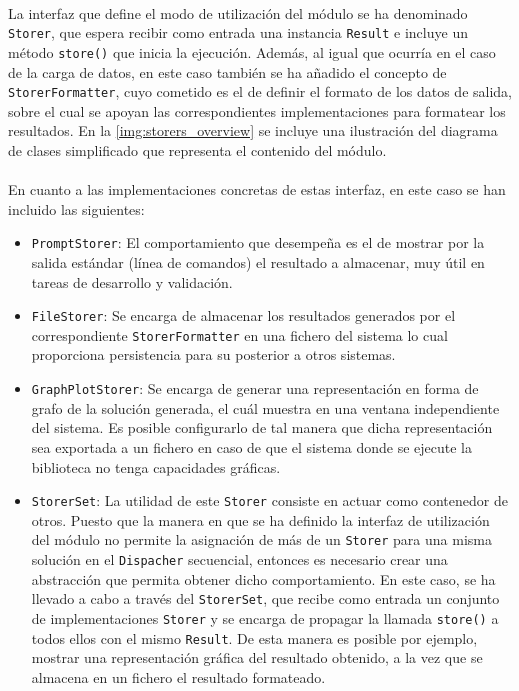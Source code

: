 \documentclass{subfiles}
\begin{document}
          \paragraph{}
          La interfaz que define el modo de utilización del módulo se ha denominado \texttt{Storer}, que espera recibir como entrada una instancia \texttt{Result} e incluye un método \verb|store()| que inicia la ejecución. Además, al igual que ocurría en el caso de la carga de datos, en este caso también se ha añadido el concepto de \texttt{StorerFormatter}, cuyo cometido es el de definir el formato de los datos de salida, sobre el cual se apoyan las correspondientes implementaciones para formatear los resultados. En la \cref{img:storers_overview} se incluye una ilustración del diagrama de clases simplificado que representa el contenido del módulo.

          \paragraph{}
          En cuanto a las implementaciones concretas de estas interfaz, en este caso se han incluido las siguientes:

          \begin{itemize}

            \item \texttt{PromptStorer}: El comportamiento que desempeña es el de mostrar por la salida estándar (línea de comandos) el resultado a almacenar, muy útil en tareas de desarrollo y validación.

            \item \texttt{FileStorer}: Se encarga de almacenar los resultados generados por el correspondiente \texttt{StorerFormatter} en una fichero del sistema lo cual proporciona persistencia para su posterior a otros sistemas.

            \item \texttt{GraphPlotStorer}: Se encarga de generar una representación en forma de grafo de la solución generada, el cuál muestra en una ventana independiente del sistema. Es posible configurarlo de tal manera que dicha representación sea exportada a un fichero en caso de que el sistema donde se ejecute la biblioteca no tenga capacidades gráficas.

            \item \texttt{StorerSet}: La utilidad de este \texttt{Storer} consiste en actuar como contenedor de otros. Puesto que la manera en que se ha definido la interfaz de utilización del módulo no permite la asignación de más de un \texttt{Storer} para una misma solución en el \texttt{Dispacher} secuencial, entonces es necesario crear una abstracción que permita obtener dicho comportamiento. En este caso, se ha llevado a cabo a través del \texttt{StorerSet}, que recibe como entrada un conjunto de implementaciones \texttt{Storer} y se encarga de propagar la llamada \verb|store()| a todos ellos con el mismo \texttt{Result}. De esta manera es posible por ejemplo, mostrar una representación gráfica del resultado obtenido, a la vez que se almacena en un fichero el resultado formateado.

          \end{itemize}
\end{document}
